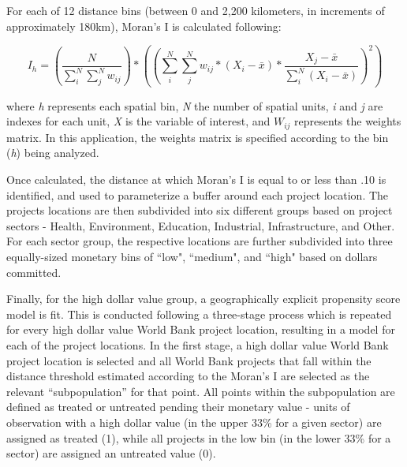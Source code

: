 \documentclass{article}\usepackage[]{graphicx}\usepackage[]{color}
\newenvironment{knitrout}{}{}  %
\begin{document}
\begin{knitrout}
\par
For each of 12 distance bins (between 0 and 2,200 kilometers, in increments of approximately 180km), Moran's I is calculated following:

\begin{equation}
I_h = (\frac{N}{\sum_{i}^{N}\sum_{j}^{N}w_{ij}}) * ((\sum_{i}^{N}\sum_{j}^{N}w_{ij} * (X_{i}-\bar{x}) * \frac{X_{j} - \bar{x}}{\sum_{i}^{N}(X_{i}-\bar{x})})^{2})
\label{EQmoran}
\end{equation}

where \textit{h} represents each spatial bin, \textit{N} the number of spatial units, \textit{i} and \textit{j} are indexes for each unit, \textit{X} is the variable of interest, and \begin{math}W_{ij}\end{math} represents the weights matrix.  
In this application, the weights matrix is specified according to the bin (\textit{h}) being analyzed.  

\par
Once calculated, the distance at which Moran's I is equal to or less than .10 is identified, and used to parameterize a buffer around each project location. 
The projects locations are then subdivided into six different groups based on project sectors - Health, Environment, Education, Industrial, Infrastructure, and Other. 
For each sector group, the respective locations are further subdivided into three equally-sized monetary bins of ``low", ``medium", and ``high" based on dollars committed.

\par

Finally, for the high dollar value group, a geographically explicit propensity score model is fit.  
This is conducted following a three-stage process which is repeated for every high dollar value World Bank project location, resulting in a model for each of the project locations.
In the first stage, a high dollar value World Bank project location is selected and all World Bank projects that fall within the distance threshold estimated according to the Moran's I are selected as the relevant ``subpopulation'' for that point.
All points within the subpopulation are defined as treated or untreated pending their monetary value - units of observation with a high dollar value (in the upper 33\% for a given sector) are assigned as treated (1), while all projects in the  low bin (in the lower 33\% for a sector) are assigned an untreated value (0).


\end{knitrout}
\end{document}
